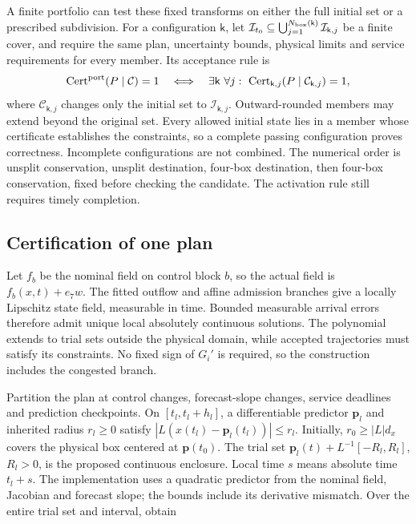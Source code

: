\documentclass[preprint,12pt]{elsarticle}
\theoremstyle{definition}
\theoremstyle{plain}
\theoremstyle{definition}
\theoremstyle{plain}
\begin{document}
A finite portfolio can test these fixed transforms on either the full
initial set or a prescribed subdivision. For a configuration $\mathsf k$, let
$\mathcal I_{t_0}\subseteq\bigcup_{j=1}^{N_{\rm box}(\mathsf k)}\mathcal I_{\mathsf k,j}$ be a finite cover,
and require the same plan, uncertainty bounds, physical limits and service
requirements for every member. Its acceptance rule is
\begin{equation}
 \operatorname{Cert}^{\rm port}(P\mid\mathcal C)=1
 \quad\Longleftrightarrow\quad
 \exists\mathsf k\ \forall j:\
 \operatorname{Cert}_{\mathsf k,j}(P\mid\mathcal C_{\mathsf k,j})=1,
\label{eq:portfolio-cover-rule}
\end{equation}
where $\mathcal C_{\mathsf k,j}$ changes only the initial set to
$\mathcal I_{\mathsf k,j}$. Outward-rounded members may extend beyond
the original set. Every allowed initial state lies in a member whose
certificate establishes the constraints, so a complete passing
configuration proves correctness. Incomplete configurations are not
combined. The numerical order is unsplit conservation, unsplit destination,
four-box destination, then four-box conservation, fixed before checking
the candidate. The activation rule still requires timely completion.

\subsection{Certification of one plan}
\label{app:new-enclosure-proof}

Let $f_b$ be the nominal field on control block $b$, so the actual field
is $f_b(x,t)+e_7w$. The fitted outflow and affine admission branches give
a locally Lipschitz state field, measurable in time. Bounded measurable
arrival errors therefore admit unique local absolutely continuous
solutions. The polynomial extends to trial sets outside the physical
domain, while accepted trajectories must satisfy its constraints.
No fixed sign of $G_i'$ is required, so the construction includes the
congested branch.

Partition the plan at control changes, forecast-slope changes, service
deadlines and prediction checkpoints. On $[t_l,t_l+h_l]$, a differentiable
predictor $\mathbf p_l$ and inherited radius $r_l\ge0$ satisfy
$|L(x(t_l)-\mathbf p_l(t_l))|\le r_l$. Initially, $r_0\ge|L|d_x$ covers
the physical box centered at $\mathbf p(t_0)$. The trial set
$\mathbf p_l(t)+L^{-1}[-R_l,R_l]$, $R_l>0$, is the proposed continuous
enclosure. Local time $s$ means absolute time $t_l+s$. The implementation
uses a quadratic predictor from the nominal field, Jacobian and forecast
slope; the bounds include its derivative mismatch. Over the entire
trial set and interval, obtain
\end{document}
